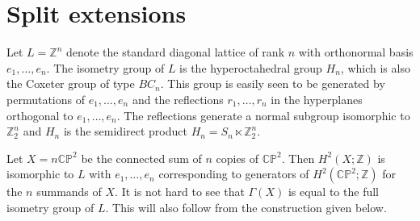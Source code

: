 \documentclass{amsart}
\theoremstyle{definition}
\theoremstyle{remark}
\numberwithin{equation}{section}
\begin{document}
\section{Split extensions}\label{sec:split}

Let $L = \mathbb{Z}^n$ denote the standard diagonal lattice of rank $n$ with orthonormal basis $e_1, \dots , e_n$. The isometry group of $L$ is the hyperoctahedral group $H_n$, which is also the Coxeter group of type $BC_n$. This group is easily seen to be generated by permutations of $e_1, \dots , e_n$ and the reflections $r_1, \dots , r_n$ in the hyperplanes orthogonal to $e_1, \dots , e_n$. The reflections generate a normal subgroup isomorphic to $\mathbb{Z}_2^n$ and $H_n$ is the semidirect product $H_n = S_n \ltimes \mathbb{Z}_2^n$.

Let $X = n \mathbb{CP}^2$ be the connected sum of $n$ copies of $\mathbb{CP}^2$. Then $H^2(X ; \mathbb{Z})$ is isomorphic to $L$ with $e_1, \dots , e_n$ corresponding to generators of $H^2(\mathbb{CP}^2 ; \mathbb{Z})$ for the $n$ summands of $X$. It is not hard to see that $\Gamma(X)$ is equal to the full isometry group of $L$. This will also follow from the construction given below.
\end{document}
